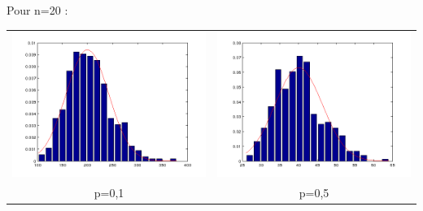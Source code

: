 \documentclass{article}
\begin{document}
Pour n=20 : \\
\begin{tabular}{c c}
	\includegraphics[scale=0.5]{graph/n20p1.png} & 
	\includegraphics[scale=0.5]{graph/n20p5.png} \\
	p=0,1 &	p=0,5
\end{tabular}\\
\end{document}
